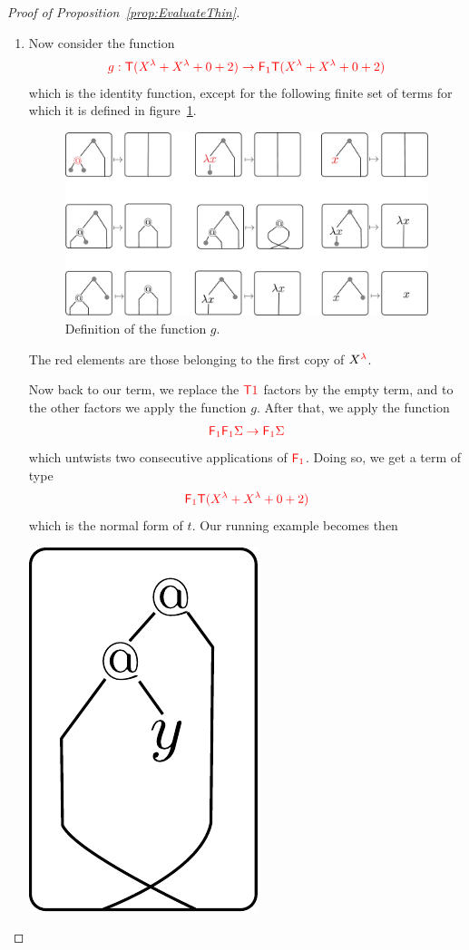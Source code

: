 \begin{proof}[Proof of Proposition~\ref{prop:EvaluateThin}]
\begin{enumerate}
\item Now consider the function 
 \begin{align*}
 {\color{red}{g: {\color{red}{\mathsf T}}(X^\lambda+X^\lambda+0+2) \to {\color{red}{\mathsf F_{1}}}{\color{red}{\mathsf T}}(X^\lambda+X^\lambda+0+2)}}
 \end{align*}
 which is the identity function, except for the following finite set of terms for which it is defined in figure~\ref{fig:definition-g}.
\begin{figure}
\begin{center}
\includegraphics[scale=.3]{pictures/function-g}
\end{center}
\caption{Definition of the function $g$.} \label{fig:definition-g}
\end{figure}
The red elements are those belonging to the first copy of ${X}^{{\color{red}{\lambda}}}$.
\smallskip

Now back to our term, we replace the  ${\color{red}{{\color{red}{\mathsf T}}1}}$ factors by the empty term, and to the other factors we apply the function $g$. After that, we apply the function 
\begin{align*}
{\color{red}{{\color{red}{\mathsf F_{1}}}{\color{red}{\mathsf F_{1}}}\Sigma \to {\color{red}{\mathsf F_{1}}}\Sigma}}
\end{align*}
which untwists two consecutive applications of $\reduce 1$. Doing so, we get a term of type  $${\color{red}{{\color{red}{\mathsf F_{1}}}{\color{red}{\mathsf T}}(X^\lambda+X^\lambda+0+2)}}$$ which is  the normal form of $t$. Our running example becomes then
\begin{center}
\includegraphics[scale=.3]{pictures/running-thin-5}
\end{center}


\end{enumerate}
\end{proof}
